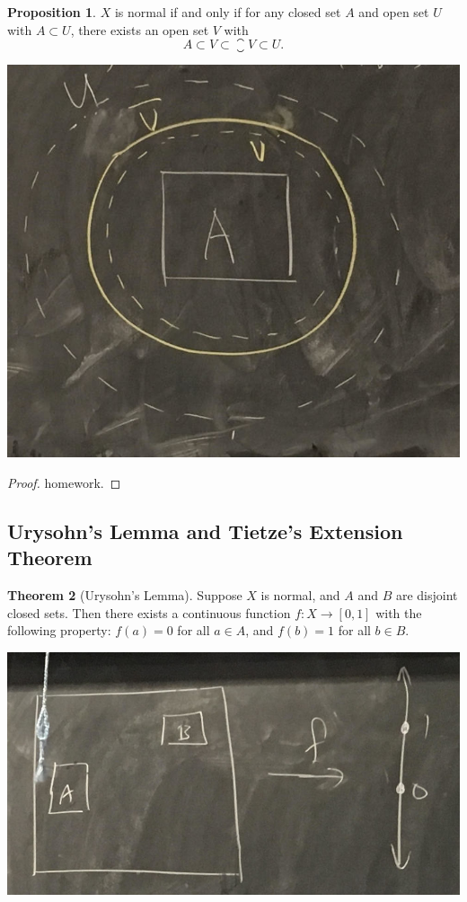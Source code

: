 \documentclass[a5paper]{article}
\theoremstyle{definition}%
\newtheorem{theorem}{Theorem}
\newtheorem{proposition}[theorem]{Proposition}
\numberwithin{exercise}{section}
\theoremstyle{remark}%
\begin{document}
\begin{highlight}
\begin{proposition}
$X$ is normal if and only if for any closed set $A$ and open set $U$ with $A\subset U$, there exists an open set $V$ with 
$$A\subset V \subset \closure{V} \subset U.$$
\end{proposition}
\end{highlight}
\begin{center}
\includegraphics[scale=.16]{images/separation_3}
\end{center}
\begin{proof}
homework.
\end{proof}

\subsection{Urysohn's Lemma and Tietze's Extension Theorem}
\begin{highlight}
\begin{theorem}[Urysohn's Lemma]
Suppose $X$ is normal, and $A$ and $B$ are disjoint closed sets. Then there exists a continuous function $f:X\to [0,1]$ with the following property:
$f(a)=0$ for all $a\in A$, and $f(b)=1$ for all $b\in B$. 
\end{theorem}
\end{highlight}
\begin{center}
\includegraphics[scale=.18]{images/separation_4}
\end{center}
\end{document}
